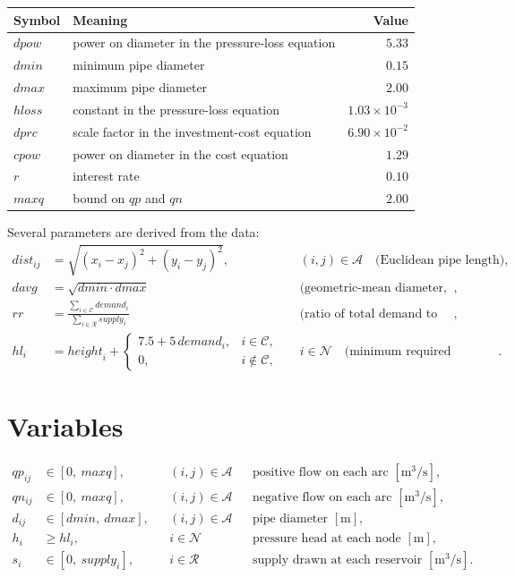 \documentclass[11pt]{article}
\newcommand{\R}{\mathcal{R}}   %
\newcommand{\Cs}{\mathcal{C}}  %
\newcommand{\N}{\mathcal{N}}   %
\newcommand{\A}{\mathcal{A}}   %
\begin{document}
\begin{center}
\begin{tabular}{llr}
\toprule
Symbol & Meaning & Value \\
\midrule
$\mathit{dpow}$  & power on diameter in the pressure-loss equation & $5.33$ \\
$\mathit{dmin}$  & minimum pipe diameter & $0.15$ \\
$\mathit{dmax}$  & maximum pipe diameter & $2.00$ \\
$\mathit{hloss}$ & constant in the pressure-loss equation & $1.03\times10^{-3}$ \\
$\mathit{dprc}$  & scale factor in the investment-cost equation & $6.90\times10^{-2}$ \\
$\mathit{cpow}$  & power on diameter in the cost equation & $1.29$ \\
$r$              & interest rate & $0.10$ \\
$\mathit{maxq}$  & bound on $qp$ and $qn$ & $2.00$ \\
\bottomrule
\end{tabular}
\end{center}

Several parameters are derived from the data:
\begin{align}
\mathit{dist}_{ij} &= \sqrt{(x_i - x_j)^2 + (y_i - y_j)^2},
   && (i,j)\in\A \quad\text{(Euclidean pipe length)},\\
\mathit{davg} &= \sqrt{\mathit{dmin}\cdot\mathit{dmax}}
   && \text{(geometric-mean diameter, used for initialization)},\\
\mathit{rr} &= \frac{\sum_{i\in\Cs}\mathit{demand}_i}
                    {\sum_{i\in\R}\mathit{supply}_i}
   && \text{(ratio of total demand to total supply)},\\
\mathit{hl}_i &= \mathit{height}_i +
   \begin{cases} 7.5 + 5\,\mathit{demand}_i, & i \in \Cs,\\[2pt] 0, & i \notin \Cs,\end{cases}
   && i\in\N \quad\text{(minimum required pressure head)}.
\end{align}

\section{Variables}

\begin{align}
qp_{ij} &\in [0,\ \mathit{maxq}], && (i,j)\in\A &&\text{positive flow on each arc } [\mathrm{m^3/s}],\\
qn_{ij} &\in [0,\ \mathit{maxq}], && (i,j)\in\A &&\text{negative flow on each arc } [\mathrm{m^3/s}],\\
d_{ij}  &\in [\mathit{dmin},\ \mathit{dmax}], && (i,j)\in\A &&\text{pipe diameter } [\mathrm{m}],\\
h_i     &\ge \mathit{hl}_i, && i\in\N &&\text{pressure head at each node } [\mathrm{m}],\\
s_i     &\in [0,\ \mathit{supply}_i], && i\in\R &&\text{supply drawn at each reservoir } [\mathrm{m^3/s}].
\end{align}
\end{document}
